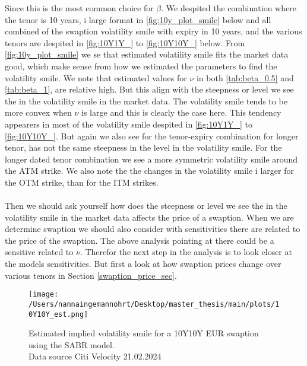 Since this is the most common choice for $\beta$. We despited the combination where the tenor is 10 years, i large format in 
\autoref{fig:10y_plot_smile} below and all combined of the swaption volatility smile with expiry in 10 years, and the 
various tenors are despited in \autoref{fig:10Y1Y_} to \autoref{fig:10Y10Y_} below. 
From \autoref{fig:10y_plot_smile}  we se that estimated volatility smile fits the market data good, which make sense from 
how we estimated the parameters to find the volatility smile. We note that estimated values for $\nu$ in both 
\autoref{tab:beta_0.5} and \autoref{tab:beta_1}, are relative high. But this align with the steepness or level we see the in the 
volatility smile in the market data. The volatility smile tends to be more convex when $\nu$ is large and this is clearly 
the case here. This tendency appearers in  most of the volatility smile despited in \autoref{fig:10Y1Y_} to \autoref{fig:10Y10Y_}.
But again we also see for the tenor-expiry combination for longer tenor, has not the same steepness in the level in 
the volatility smile. For the longer dated tenor combination we see a more symmetric volatility smile around the
ATM strike. We also note the the changes in the volatility smile i larger for the OTM strike, than for the ITM strikes. 
\\\\
Then we should ask yourself how does the  steepness or level we see the in the 
volatility smile in the market data affects the price of a swaption. When we are determine swaption we should also consider 
with sensitivities there are related to the price of the swaption. The above analysis pointing at there could 
be a sensitive related to $\nu$. Therefor the next step in the analysis is to look closer at the models sensitivities. 
But first a look at how swaption prices change over various tenors in Section \ref{swaption_price_sec}.

\begin{figure}[H]
    \centering
    \texttt{[image: /Users/nannaingemannohrt/Desktop/master\_thesis/main/plots/10Y10Y\_est.png]}
    \caption{Estimated implied volatility smile for a 10Y10Y EUR swaption using the SABR model. 
    \\ Data source Citi Velocity 21.02.2024}
    \label{fig:10y_plot_smile}
\end{figure}
\noindent


